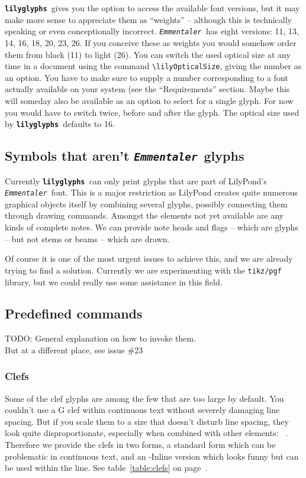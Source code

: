 \documentclass{article}
\newcommand*{\lilyglyphs}{\texttt{\textbf{lilyglyphs\,}}}
\newcommand*{\emmentaler}{\texttt{\textit{Emmentaler }}}
\newcommand*{\cmd}[1]{\texttt{\textbackslash #1}}
\begin{document}
\lilyglyphs gives you the option to access the available font versions, but it may make more sense to appreciate them as \enquote{weights} -- although this is technically speaking or even conceptionally incorrect.
\emmentaler has eight versions: 11, 13, 14, 16, 18, 20, 23, 26. 
If you conceive these as weights you would somehow order them from black (11) to light (26).
You can switch the used optical size at any time in a document using the command \cmd{lilyOpticalSize}, giving the number as an option. 
You have to make sure to supply a number corresponding to a font actually available on your system (see the \enquote{Requirements} section.
Maybe this will someday also be available as an option to select for a single glyph.
For now you would have to switch twice, before and after the glyph.
The optical size used by \lilyglyphs defaults to 16.

\subsection{Symbols that aren't \emmentaler glyphs}
Currently \lilyglyphs can only print glyphs that are part of LilyPond's \emmentaler font. 
This is a major restriction as LilyPond creates quite numerous graphical objects itself by combining several glyphs, possibly connecting them through drawing commands.
Amongst the elements not yet available are any kinds of complete notes.
We can provide note heads and flags -- which are glyphs -- but not stems or beams -- which are drawn.

Of course it is one of the most urgent issues to achieve this, and we are already trying to find a solution. 
Currently we are experimenting with the \texttt{tikz/pgf} library, but we could really use some assistance in this field.

\subsection{Predefined commands}
{\color{red}TODO: General explanation on how to invoke them. \\
But at a different place, see issue \#23}

\subsubsection{Clefs}
Some of the clef glyphs are among the few that are too large by default. 
You couldn't use a G clef within continuous text without severely \clefG* damaging line spacing. 
But if you scale them to a size that doesn't disturb line spacing, they look quite disproportionate, especially when combined with other elements: \mbox{ \clefCInline* \natural.}
Therefore we provide the clefs in two forms, a standard form which can be problematic in continuous text, and an -Inline version which looks funny but can be used within the line.
See table~\ref{table:clefs} on page~\pageref{table:clefs}.
\end{document}
